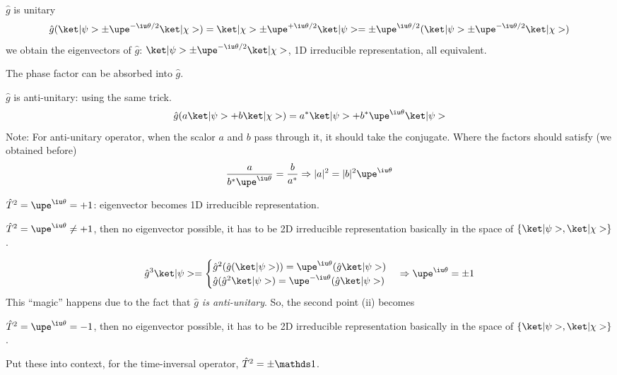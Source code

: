 \begin{enumext}
  \item $\hat g$ is unitary
  \[
    \hat g(\ket|\psi> \pm \upe^{-\iu\theta/2} \ket|\chi>)
  = \ket|\chi> \pm \upe^{+\iu\theta/2} \ket|\psi>
  = \pm \upe^{\iu\theta/2} (\ket|\psi> \pm \upe^{-\iu\theta/2} \ket|\chi>)
  \]
  we obtain the eigenvectors of $\hat g$:
  $\ket|\psi> \pm \upe^{-\iu\theta/2} \ket|\chi>$, 1D irreducible
  representation, all equivalent.

  The phase factor can be absorbed into $\hat g$.
  \item $\hat g$ is anti-unitary: using the same trick.
  \[
    \hat g(a\ket|\psi> + b\ket|\chi>) = a^*\ket|\psi>
  + b^*\upe^{\iu\theta} \ket|\psi>
  \]
  Note: For anti-unitary operator, when the scalor $a$ and $b$ pass through it,
  it should take the conjugate. Where the factors should satisfy
  (we obtained before)
  \[
    \frac a{b^*\upe^{\iu\theta}} = \frac b{a^*} \Rightarrow
    |a|^2 = |b|^2\upe^{\iu\theta}
  \]
  \begin{enumext}
    \item $\hat T^2 = \upe^{\iu\theta} = +1$: eigenvector becomes 1D irreducible
    representation.
    \item $\hat T^2 = \upe^{\iu\theta} \neq +1$, then no eigenvector possible, it has to be
    2D irreducible representation basically in the space of
    $\{\ket|\psi>, \ket|\chi>\}$.
  \begin{remark}
    \[
      \hat g^3 \ket|\psi> =
      \begin{cases}
        \hat g^2 (\hat g(\ket|\psi>)) = \upe^{\iu\theta} (\hat g\ket|\psi>)\\
        \hat g (\hat g^2 \ket|\psi>) = \upe^{-\iu\theta} (\hat g\ket|\psi>)
      \end{cases} \Rightarrow \upe^{\iu\theta} = \pm 1
    \]
    This ``magic'' happens due to the fact that \emph{$\hat g$ is anti-unitary}.
    So, the second point (ii) becomes
  \end{remark}
  \item $\hat T^2 = \upe^{\iu\theta} = -1$, then no eigenvector possible, it has
  to be 2D irreducible representation basically in the space of
  $\{\ket|\psi>, \ket|\chi>\}$.
  \end{enumext}
\end{enumext}
Put these into context, for the time-inversal operator,
$\hat T^2 = \pm \identity$.
